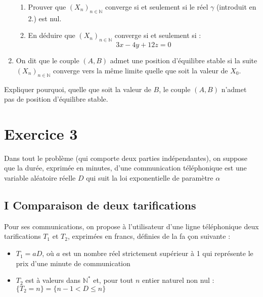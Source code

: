 \documentclass[a4paper, 11pt,reqno]{article}
\begin{document}
\begin{enumerate}
\begin{enumerate}
\item Prouver que $\left( X_{n}\right) _{n\in \mathbb{N}}$ converge si et
seulement si le réel $\gamma $ (introduit en 2.) est nul.

\item En déduire que $\left( X_{n}\right) _{n\in \mathbb{N}}$ converge si et
seulement si : 
\begin{equation*}
3x-4y+12z=0
\end{equation*}
\end{enumerate}

\item On dit que le couple $(A,B)$ admet une position d'équilibre stable si
la suite $\left( X_{n}\right) _{n\in \mathbb{N}}$ converge vers la même
limite quelle que soit la valeur de $X_{0}$.
\end{enumerate}

Expliquer pourquoi, quelle que soit la valeur de $B$, le couple $\left(
A,B\right) $ n'admet pas de position d'équilibre stable.

\section*{Exercice 3}

Dans tout le problème (qui comporte deux parties indépendantes), on suppose
que la durée, exprimée en minutes, d'une communication téléphonique est une
variable aléatoire réelle $D$ qui suit la loi exponentielle de paramètre $%
\alpha $

\subsection*{I Comparaison de deux tarifications}

Pour ses communications, on propose à l'utilisateur d'une ligne téléphonique
deux tarifications $T_{1}$ et $T_{2}$, exprimées en francs, définies de la fa%
çon suivante :

\begin{itemize}
\item $T_{1}=aD$, où $a$ est un nombre réel strictement supérieur à 1 qui
représente le prix d'une minute de communication

\item $T_{2}$ est à valeurs dans $\mathbb{N}^{\ast }$ et, pour tout $n$
entier naturel non nul : $\{T_{2}=n\}=\{n-1<D\leqslant n\}$
\end{itemize}
\end{document}

